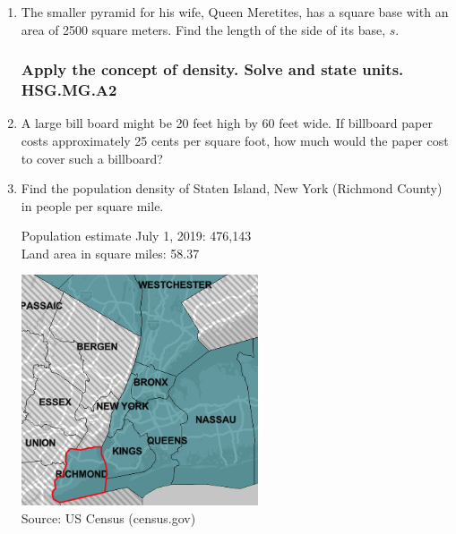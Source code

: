 \begin{enumerate}
\item The smaller pyramid for his wife, Queen Meretites, has a square base with an area of 2500 square meters. Find the length of the side of its base, $s$.

\newpage
\subsubsection*{Apply the concept of density. Solve and state units. \hfill HSG.MG.A2}

\item A large bill board might be 20 feet high by 60 feet wide. If billboard paper costs approximately 25 cents per square foot, how much would the paper cost to cover such a billboard? \vspace{3cm}

\item Find the population density of Staten Island, New York (Richmond County) in people per square mile.
  \begin{multicols}{2}
  Population estimate July 1, 2019: 476,143\\[0.25cm]
  Land area in square miles: 58.37
  \begin{flushright}
    \includegraphics[width=7cm]{../graphics/04StatenIsland.png}\\
    Source: US Census (census.gov)
  \end{flushright}
  \end{multicols}


\end{enumerate}

